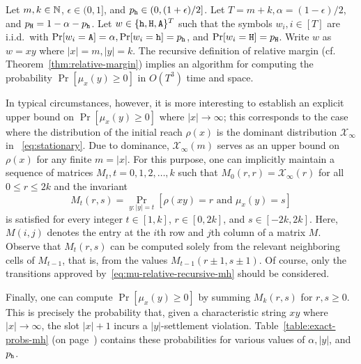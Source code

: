 Let $m, k \in \mathbb{N}$, $\epsilon \in (0,1]$, and $p_{\mathtt{h}} \in (0, (1+\epsilon)/2]$.
Let $T = m + k, \alpha = (1 - \epsilon)/2$, and $p_{\mathtt{H}} = 1 - \alpha - p_{\mathtt{h}}$. 
Let $w \in \{\mathtt{h}, \mathtt{H}, \mathtt{A}\}^T$ such that 
the symbols $w_i, i \in [T]$ are i.i.d.\, with 
$\Pr[w_i = \mathtt{A}] = \alpha, \Pr[w_i = \mathtt{h}] = p_{\mathtt{h}}$, and $\Pr[w_i = \mathtt{H}] = p_{\mathtt{H}}$. 
Write $w$ as $w = xy$ where $|x| = m, |y| = k$.
The recursive definition of relative margin 
(cf. Theorem~\ref{thm:relative-margin}) 
implies an algorithm for computing the probability
$\Pr[\mu_x(y) \geq 0]$ 
in $O(T^3)$ time and space. 

In typical circumstances, however, it is more interesting to establish an
explicit upper bound on $\Pr[\mu_x(y) \geq 0]$ where
$|x| \rightarrow \infty$; this corresponds to the case where the
distribution of the initial reach $\rho(x)$ is the dominant distribution
$\mathcal{X}_\infty$ in 
~\eqref{eq:stationary}. 
Due to dominance, $\mathcal{X}_\infty(m)$ serves as an
upper bound on $\rho(x)$ for any finite $m = |x|$. 
For this purpose, one can implicitly
maintain a sequence of matrices $M_t, t = 0, 1, 2, \ldots, k$
such that $M_0(r, r) = \mathcal{X}_\infty(r)$ for all $0 \leq r \leq 2k$ and
the invariant
\[
  M_t(r, s) = \Pr_{y: |y| = t}[\rho(xy) = r \text{ and }
  \mu_x(y) = s ]
\]
is satisfied for every integer $t \in [1, k]$,
$r \in [0, 2k]$, and $s \in [-2k, 2k]$. 
Here, $M(i,j)$ denotes the entry at the $i$th row and $j$th column of a matrix $M$.
Observe that $M_t(r,s)$ can be computed solely 
from the relevant neighboring cells of $M_{t-1}$, that is, 
from the values $M_{t-1}(r\pm 1, s \pm 1)$. 
Of course, only the transitions approved by~\eqref{eq:mu-relative-recursive-mh} should be considered.

Finally, one can compute $\Pr[\mu_x(y) \geq 0]$ by summing $M_k(r,s)$ for
$r, s \geq 0$. 
This is precisely the probability that, 
given a characteristic string $xy$ where $|x| \rightarrow \infty$, 
the slot $|x| + 1$ incurs a $|y|$-settlement violation. 
Table~\ref{table:exact-probs-mh} (on page~\pageref{table:exact-probs-mh}) contains these probabilities for various values of $\alpha, |y|$, and $p_{\mathtt{h}}$. 


